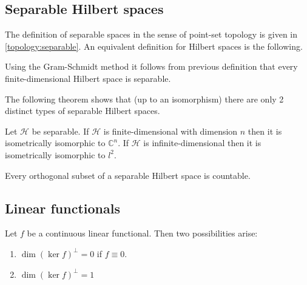 
\subsection{Separable Hilbert spaces}

	The definition of separable spaces in the sense of point-set topology is given in \ref{topology:separable}. An equivalent definition for Hilbert spaces is the following.
	\begin{result}
		Using the Gram-Schmidt method it follows from previous definition that every finite-dimensional Hilbert space is separable.
	\end{result}

	The following theorem shows that (up to an isomorphism) there are only 2 distinct types of separable Hilbert spaces.
	\begin{theorem}
		Let $\mathcal{H}$ be separable. If $\mathcal{H}$ is finite-dimensional with dimension $n$ then it is isometrically isomorphic to $\mathbb{C}^n$. If $\mathcal{H}$ is infinite-dimensional then it is isometrically isomorphic to $l^2$.
	\end{theorem}
	\begin{property}
		Every orthogonal subset of a separable Hilbert space is countable.
	\end{property}

\subsection{Linear functionals}

	\begin{property}
		Let $f$ be a continuous linear functional. Then two possibilities arise:
		\begin{enumerate}
			\item $\dim(\ker f)^\perp=0$ if $f\equiv0$.
			\item $\dim(\ker f)^\perp=1$
		\end{enumerate}
	\end{property}

